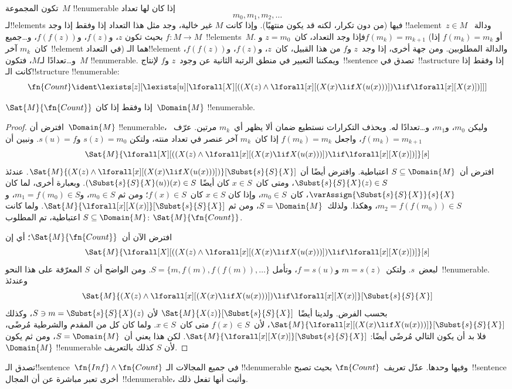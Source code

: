 \documentclass[../../../include/open-logic-section]{subfiles}
\begin{document}
تكون المجموعة~$M$ !!{enumerable} إذا كان لها تعداد
\[
m_0, m_1, m_2, \dots
\]
لـ!!{element}s فيها (من دون تكرار، لكنه قد يكون منتهيًا). وإذا كانت
$M$ غير خالية، وجد مثل هذا التعداد إذا وفقط إذا وجد
!!a{element}~$z \in M$ ودالة~$f\colon M \to M$ بحيث تكون
$z$، و$f(z)$، و$f(f(z))$، و\dots جميع~!!{element}s~$M$. فإذا وجد
التعداد، كان~$z = m_0$ و$f(m_k) = m_{k+1}$ (أو
$f(m_k) = m_k$ إذا كان~$m_k$ آخر~!!{element} في التعداد) هما
الـ!!{element} والدالة المطلوبين. ومن جهة أخرى، إذا وجد~$z$ و$f$ من
هذا القبيل، كان~$z$، و$f(z)$، و$f(f(z))$، و\dots تعدادًا لـ$M$،
فتكون~$M$ !!{enumerable}. ويمكننا التعبير في منطق الرتبة الثانية عن
وجود~$z$ و$f$ لإنتاج~!!{sentence} تصدق في~!!a{structure} إذا وفقط
إذا كانت الـ!!{structure} !!{enumerable}:
\[
\fn{Count} \ident
\lexists[z][\lexists[u][\lforall[X][((X(z) \land
      \lforall[x][(X(x) \lif X(u(x)))]) \lif \lforall[x][X(x)])]]]
\]

\begin{prop}
$\Sat{M}{\fn{Count}}$ إذا وفقط إذا كان~$\Domain{M}$ !!{enumerable}.
\end{prop}

\begin{proof}
افترض أن~$\Domain{M}$ !!{enumerable}، وليكن
$m_0$، و$m_1$، و\dots تعدادًا له. وبحذف التكرارات نستطيع ضمان ألا
يظهر أي~$m_k$ مرتين. عرّف~$f(m_k) = m_{k+1}$، واجعل
$f(m_k)=m_k$ إذا كان~$m_k$ آخر عنصر في تعداد منته، ولتكن
$s(z) = m_0$ و$s(u) = f$. ونبين أن
\[
\Sat{M}{\lforall[X][((X(z) \land \lforall[x][(X(x) \lif X(u(x)))])
    \lif \lforall[x][X(x)])]}[s]
\]
افترض أن~$S \subseteq \Domain{M}$ اعتباطية. وافترض أيضًا أن
$\Sat{M}{(X(z) \land \lforall[x][(X(x) \lif
X(u(x)))])}[\Subst{s}{S}{X}]$. عندئذ
$\Subst{s}{S}{X}(z) \in S$، ومتى كان~$x \in S$ كان أيضًا
$(\Subst{s}{S}{X}(u))(x) \in S$. وبعبارة أخرى، لما كان
$\varAssign{\Subst{s}{S}{X}}{s}{X}$، كان~$m_0 \in S$، وإذا كان
$x \in S$ كان~$f(x) \in S$؛ ومن ثم
$m_0 \in S$، و$m_1 = f(m_0) \in S$، و
$m_2 = f(f(m_0)) \in S$، وهكذا. ولذلك~$S = \Domain{M}$، ومن ثم
$\Sat{M}{\lforall[x][X(x)]}[\Subst{s}{S}{X}]$. ولما كانت
$S \subseteq \Domain{M}$ اعتباطية، تم المطلوب:
$\Sat{M}{\fn{Count}}$.

افترض الآن أن~$\Sat{M}{\fn{Count}}$؛ أي إن
\[
\Sat{M}{\lforall[X][((X(z) \land \lforall[x][(X(x) \lif X(u(x)))])
    \lif \lforall[x][X(x)])]}[s]
\]
لبعض~$s$. ولتكن~$m = s(z)$ و$f = s(u)$، وتأمل
$S = \{m, f(m), f(f(m)), \dots\}$. ومن الواضح أن~$S$ المعرّفة على
هذا النحو~!!{enumerable}. وعندئذ
\[
\Sat{M}{(X(z) \land \lforall[x][(X(x) \lif X(u(x)))])
    \lif \lforall[x][X(x)]}[\Subst{s}{S}{X}]
\]
بحسب الفرض. ولدينا أيضًا~$\Sat{M}{X(z)}[\Subst{s}{S}{X}]$ لأن
$S \ni m = \Subst{s}{S}{X}(z)$، وكذلك
$\Sat{M}{\lforall[x][(X(x) \lif
X(u(x)))]}[\Subst{s}{S}{X}]$، لأن~$f(x) \in S$ متى كان~$x \in S$.
ولما كان كل من المقدم والشرطية مُرضًى، فلا بد أن يكون التالي مُرضًى
أيضًا: $\Sat{M}{\lforall[x][X(x)]}[\Subst{s}{S}{X}]$. لكن هذا يعني
أن~$S = \Domain{M}$، ومن ثم يكون~$\Domain{M}$ !!{enumerable} لأن
$S$ كذلك بالتعريف.
\end{proof}

\begin{prob}
تصدق الـ!!{sentence}~$\fn{Inf} \land \fn{Count}$ في جميع المجالات الـ
!!{denumerable} وفيها وحدها. عدّل تعريف~$\fn{Count}$ بحيث
تصبح~!!{sentence} أخرى تعبر مباشرة عن أن المجال~!!{denumerable}،
وأثبت أنها تفعل ذلك.
\end{prob}
\end{document}
